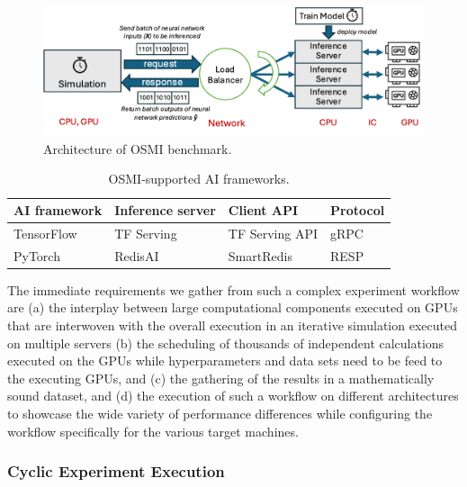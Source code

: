 \documentclass[utf8]{FrontiersinVancouver} %
\begin{document}
\begin{figure}[t]
    \centering
    \includegraphics[width=\linewidth]{images/osmi_arch.png}
    \caption{Architecture of OSMI benchmark.}
    \label{fig:osmi}
\end{figure}

\begin{table}[t]
\centering
\renewcommand{\arraystretch}{1.5}
\begin{tabular}{llll}
\hline
\textbf{AI framework} & \textbf{Inference server} & \textbf{Client API} & \textbf{Protocol} \\ \hline
TensorFlow & TF Serving  & TF Serving API  & gRPC  \\
PyTorch    & RedisAI     & SmartRedis      & RESP  \\ \hline
\end{tabular}
\caption{OSMI-supported AI frameworks.}
\label{tab:osmi}
\end{table}

\begin{BOX}
The immediate requirements we gather from such a complex experiment workflow are (a) the interplay between large computational components executed on GPUs that are interwoven with the overall execution in an iterative simulation executed on multiple servers (b) the scheduling of thousands of independent calculations executed on the GPUs while hyperparameters and data sets need to be feed to the executing GPUs, and (c) the gathering of the results in a mathematically sound dataset, and (d) the execution of such a workflow on different architectures to showcase the wide variety of performance differences while configuring the workflow specifically for the various target machines.
\end{BOX}


\subsubsection{Cyclic Experiment Execution} \label{subsubsection:cyclic}
\end{document}

